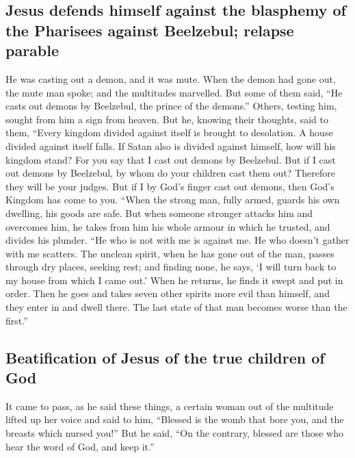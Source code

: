 \hypertarget{jesus-defends-himself-against-the-blasphemy-of-the-pharisees-against-beelzebul-relapse-parable}{%
\subsection{Jesus defends himself against the blasphemy of the Pharisees
against Beelzebul; relapse
parable}\label{jesus-defends-himself-against-the-blasphemy-of-the-pharisees-against-beelzebul-relapse-parable}}

 He was casting out a demon, and it was mute. When the
demon had gone out, the mute man spoke; and the multitudes marvelled.
 But some of them said, ``He casts out demons by
Beelzebul, the prince of the demons.''  Others, testing
him, sought from him a sign from heaven.  But he, knowing
their thoughts, said to them, ``Every kingdom divided against itself is
brought to desolation. A house divided against itself falls.
 If Satan also is divided against himself, how will his
kingdom stand? For you say that I cast out demons by Beelzebul.
 But if I cast out demons by Beelzebul, by whom do your
children cast them out? Therefore they will be your judges.
 But if I by God's finger cast out demons, then God's
Kingdom has come to you.  ``When the strong man, fully
armed, guards his own dwelling, his goods are safe.  But
when someone stronger attacks him and overcomes him, he takes from him
his whole armour in which he trusted, and divides his plunder.
 ``He who is not with me is against me. He who doesn't
gather with me scatters.  The unclean spirit, when he has
gone out of the man, passes through dry places, seeking rest; and
finding none, he says, `I will turn back to my house from which I came
out.'  When he returns, he finds it swept and put in
order.  Then he goes and takes seven other spirits more
evil than himself, and they enter in and dwell there. The last state of
that man becomes worse than the first.''

\hypertarget{beatification-of-jesus-of-the-true-children-of-god}{%
\subsection{Beatification of Jesus of the true children of
God}\label{beatification-of-jesus-of-the-true-children-of-god}}

 It came to pass, as he said these things, a certain
woman out of the multitude lifted up her voice and said to him,
``Blessed is the womb that bore you, and the breasts which nursed you!''
 But he said, ``On the contrary, blessed are those who
hear the word of God, and keep it.''

